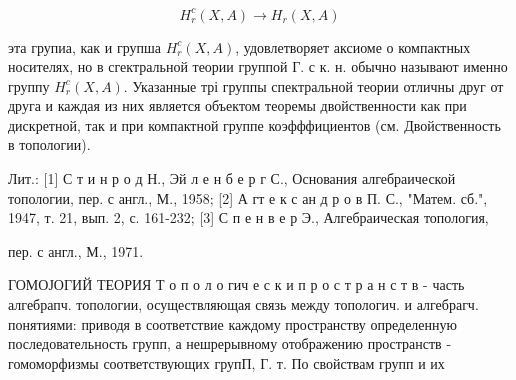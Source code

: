 \documentclass[10pt]{article}
\begin{document}
\[

H_{r}^{c}(X, A) \longrightarrow H_{r}(X, A)

\]



эта групиа, как и групша $H_{r}^{c}(X, A)$, удовлетворяет аксиоме о компактных носителях, но в сгектральной теории группой $Г$. с к. н. обычно называют именно группу $H_{r}^{c}(X, A)$. Указанные трі группы спектральной теории отличны друг от друга и каждая из них является объектом теоремы двойственности как при дискретной, так и при компактной группе коэфффициентов (см. Двойственность в топологии).



Лит.: [1] С т и н р о д Н., Эй л е н б е р г С., Основания алгебраической топологии, пер. с англ., М., 1958; [2] А гт е к с ан д р о в П. С., "Матем. сб.", 1947, т. 21, вып. 2, с. 161-232; [3] С п е н в е р Э., Алгебраическая топология,

пер. с англ., М., 1971.



ГОМОЈОГИЙ ТЕОРИЯ Т о п о л о гич е с к и п р о с т р а н с т в - часть алгебрапч. топологии, осуществляющая связь между топологич. и алгебрагч. понятиями: приводя в соответствие каждому пространству определенную последовательность групп, а нешрерывному отображению пространств - гомоморфизмы соответствующих групП, Г. т. По свойствам групп и их
\end{document}
